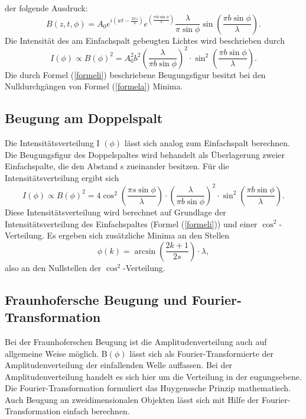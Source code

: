 \documentclass[11pt,ngerman,a4paper]{article}
\begin{document}
der folgende Ausdruck:
\begin{equation}
B (z,t,\phi) = A_0 e^{i\left( wt- \frac{2 \pi z}{\lambda}\right)} e^{\left( \frac{\pi i b \sin \phi}{\lambda}\right)} \frac{\lambda}{\pi \sin \phi} \sin \left( \frac{\pi b \sin \phi}{\lambda} \right).
\label{formela}
\end{equation}
Die Intensität des am Einfachspalt gebeugten Lichtes wird beschrieben durch
\begin{equation}
I (\phi) \propto B (\phi)^2 = A_0^2 b^2 \left ( \frac {\lambda}{\pi b \sin \phi} \right) ^2 \cdot \sin^2 \left( \frac{\pi b \sin \phi}{\lambda} \right).
\label{formeli}
\end{equation}
Die durch Formel (\ref{formeli}) beschriebene Beugungsfigur besitzt bei den Nulldurchgängen von Formel (\ref{formela}) Minima.
\subsection{Beugung am Doppelspalt}
Die Intensitätsverteilung I $(\phi)$ lässt sich analog zum Einfachspalt berechnen. Die Beugungsfigur des Doppelspaltes wird behandelt als Überlagerung zweier Einfachspalte, die den Abstand s zueinander besitzen.
Für die Intensitätsverteilung ergibt sich
\begin{equation}
I (\phi) \propto B(\phi)^2 = 4 \cos^2 \left( \frac{\pi s \sin \phi}{\lambda} \right) \cdot \left( \frac{\lambda}{\pi b \sin \phi} \right)^2 \cdot \sin^2 \left( \frac{\pi b \sin \phi}{\lambda} \right).
\end{equation}
Diese Intensitätsverteilung wird berechnet auf Grundlage der Intensitätsverteilung des Einfachspaltes (Formel (\ref{formeli})) und einer $\cos^2$-Verteilung. Es ergeben sich zusätzliche Minima an den Stellen
\begin{equation}
\phi(k) = \arcsin \left( \frac{2k+1}{2s} \right) \cdot \lambda,
\end{equation}
also an den Nullstellen der $\cos^2$-Verteilung.
\subsection{Fraunhofersche Beugung und Fourier-Transformation}
Bei der Fraunhoferschen Beugung ist die Amplitudenverteilung auch auf allgemeine Weise möglich. B$(\phi)$ lässt sich als Fourier-Transformierte der Amplitudenverteilung der einfallenden Welle auffassen. Bei der Amplitudenverteilung handelt es sich hier um die Verteilung in der eugungsebene.
\newline
Die Fourier-Transformation formuliert das Huygenssche Prinzip mathematisch. Auch Beugung an zweidimensionalen Objekten lässt sich mit Hilfe der Fourier-Transformation einfach berechnen.
\end{document}
